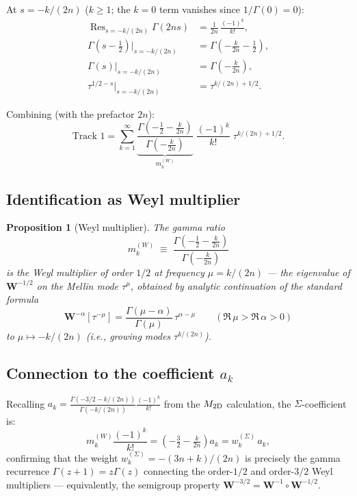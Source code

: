 \documentclass{article}
\newtheorem{proposition}[theorem]{Proposition}
\newcommand{\Res}{\operatorname{Res}}
\begin{document}
At $s = -k/(2n)$ ($k \ge 1$; the $k=0$ term vanishes since $1/\Gamma(0)=0$):
\begin{align}
\Res_{s=-k/(2n)}\Gamma(2ns) &= \frac{1}{2n}\,\frac{(-1)^k}{k!},\\[4pt]
\Gamma(s-{\textstyle\frac12})\big|_{s=-k/(2n)} &= \Gamma(-{\textstyle\frac{k}{2n}}-{\textstyle\frac12}),\\[4pt]
\Gamma(s)\big|_{s=-k/(2n)} &= \Gamma(-{\textstyle\frac{k}{2n}}),\\[4pt]
\tau^{1/2-s}\big|_{s=-k/(2n)} &= \tau^{k/(2n)+1/2}.
\end{align}

Combining (with the prefactor $2n$):
\begin{equation}\label{eq:track1-term}
\text{Track 1} = \sum_{k=1}^{\infty}
\underbrace{\frac{\Gamma(-\tfrac{1}{2}-\tfrac{k}{2n})}
{\Gamma(-\tfrac{k}{2n})}}_{\displaystyle m_k^{(W)}}
\;\frac{(-1)^k}{k!}\;\tau^{k/(2n)+1/2}.
\end{equation}

\subsection{Identification as Weyl multiplier}

\begin{proposition}[Weyl multiplier]\label{prop:multiplier}
The gamma ratio
\begin{equation}\label{eq:weyl-mult}
m_k^{(W)} \;\equiv\; \frac{\Gamma(-\tfrac{1}{2}-\tfrac{k}{2n})}{\Gamma(-\tfrac{k}{2n})}
\end{equation}
is the \emph{Weyl multiplier of order $1/2$ at frequency $\mu = k/(2n)$} ---
the eigenvalue of $\mathbf{W}^{-1/2}$ on the Mellin mode $\tau^\mu$, obtained
by analytic continuation of the standard formula
\begin{equation}
\mathbf{W}^{-\alpha}[\tau^{-\mu}]
= \frac{\Gamma(\mu-\alpha)}{\Gamma(\mu)}\,\tau^{\alpha-\mu}
\qquad(\Re\,\mu > \Re\,\alpha > 0)
\end{equation}
to $\mu \mapsto -k/(2n)$ (i.e., growing modes $\tau^{k/(2n)}$).
\end{proposition}

\subsection{Connection to the coefficient $a_k$}

Recalling $a_k = \frac{\Gamma(-3/2-k/(2n))}{\Gamma(-k/(2n))}\frac{(-1)^k}{k!}$
from the $M_{\rm 2D}$ calculation, the $\Sigma$-coefficient is:
\begin{equation}
m_k^{(W)}\frac{(-1)^k}{k!}
= \left(-\tfrac{3}{2}-\tfrac{k}{2n}\right)a_k
= w_k^{(\Sigma)}\,a_k,
\end{equation}
confirming that the weight $w_k^{(\Sigma)} = -(3n+k)/(2n)$ is precisely the
gamma recurrence $\Gamma(z+1)=z\Gamma(z)$ connecting the order-$1/2$ and
order-$3/2$ Weyl multipliers --- equivalently, the semigroup property
$\mathbf{W}^{-3/2} = \mathbf{W}^{-1}\circ\mathbf{W}^{-1/2}$.
\end{document}
